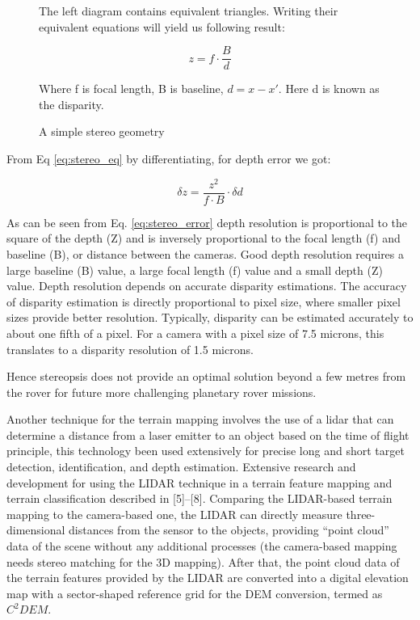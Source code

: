 \begin{figure}[H]
\begin{minipage}[h]{0.4\linewidth}
\end{minipage}
\hfill
\begin{minipage}[h]{0.45\linewidth}

The left diagram contains equivalent triangles. Writing their equivalent equations will yield us following result:

\begin{equation}\label{eq:stereo_eq}
z=f \cdot \frac{B}{d}
\end{equation}

Where f is focal length, B is baseline, $d = x-x'$. Here d is known as the disparity.

\end{minipage}
\caption{
A simple stereo geometry
}
\label{fig:lens}
\end{figure}




From Eq \ref{eq:stereo_eq} by differentiating, for depth error we got:

\begin{equation}\label{eq:stereo_error}
\delta z =  \frac{z^2}{f \cdot B} \cdot \delta d
\end{equation}

As can be seen from Eq. \ref{eq:stereo_error} depth resolution is proportional to the square of the depth (Z) and is inversely proportional to the focal length (f) and baseline (B), or distance between the cameras.
Good depth resolution requires a large baseline (B) value, a large focal length (f) value and a small depth (Z) value.
Depth resolution depends on accurate disparity estimations. The accuracy of disparity estimation is directly proportional to pixel size, where smaller pixel sizes provide better resolution. Typically, disparity can be estimated accurately to about one fifth of a pixel. For a camera with a pixel size of 7.5 microns, this translates to a disparity resolution of 1.5 microns. 

Hence stereopsis does not provide an optimal solution beyond a few metres from the rover for future more challenging planetary rover missions.

Another technique for the terrain mapping involves the use of a lidar that can determine a distance from a laser emitter to an object based on the time of flight principle,
this technology been used extensively for precise long and short target detection, identification, and depth estimation.
Extensive research and development for using the LIDAR technique in
a terrain feature mapping and terrain classification described in [5]–[8].
Comparing the LIDAR-based terrain mapping to the camera-based one, the LIDAR can directly measure
three-dimensional distances from the sensor to the objects, providing “point cloud” data of the scene without any additional processes (the camera-based mapping needs stereo matching for the 3D mapping). 
After that, the point cloud data of the terrain features provided by the LIDAR are converted into a digital elevation map with
a sector-shaped reference grid  for the DEM conversion, termed as $C^2DEM$.


